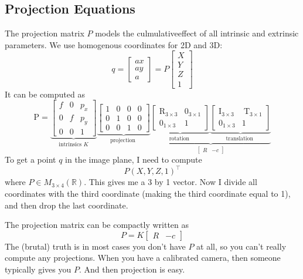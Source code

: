 \documentclass[11pt]{article}
\newcommand{\R}{\mathbb{R}}
\newcommand{\mat}[2]{M_{#1 \times #2}(\R)}
\begin{document}
\subsection{Projection Equations}
The projection matrix $P$ models the culmulativeeffect of all intrinsic and extrinsic parameters. We use homogenous coordinates for 2D and 3D:
\begin{equation}
	q = \begin{bmatrix}
		ax \\ ay \\ a
	\end{bmatrix} = P \begin{bmatrix}
		X \\ Y \\ Z \\ 1
	\end{bmatrix}
\end{equation}
It can be computed as
\begin{equation}
\mathrm{P}=\underbrace{\left[\begin{array}{ccc}
		f & 0 & p_{x} \\
		0 & f & p_{y} \\
		0 & 0 & 1
	\end{array}\right]}_{\text {intrinsics } K} \underbrace{\left[\begin{array}{cccc}
		1 & 0 & 0 & 0 \\
		0 & 1 & 0 & 0 \\
		0 & 0 & 1 & 0
	\end{array}\right]}_{\text {projection }} \underbrace{\underbrace{\left[\begin{array}{cc}
	\mathrm{R}_{3 \times 3} & 0_{3 \times 1} \\
	0_{1 \times 3} & 1
	\end{array}\right]}_{\text {rotation }} \underbrace{\left[\begin{array}{cc}
	\mathrm{I}_{3 \times 3} & \mathrm{~T}_{3 \times 1} \\
		0_{1 \times 3} & 1
	\end{array}\right]}_{\text {translation }}}_{\begin{bmatrix}
		R  &  -c
	\end{bmatrix}}
\end{equation}
To get a point $q$ in the image plane, I need to compute
\begin{equation}
	P(X, Y, Z, 1)^\top
\end{equation}
where $P\in\mat{3}{4}$. This gives me a 3 by 1 vector. Now I divide all coordinates with the third coordinate (making the third coordinate equal to 1), and then drop the last coordinate. 

The projection matrix can be compactly written as 
\begin{equation}
	P = K \begin{bmatrix}
		R & -c
	\end{bmatrix}
\end{equation}
The (brutal) truth is in most cases you don't have $P$ at all, so you can't really compute any projections. When you have a calibrated camera, then someone typically gives you $P$. And then projection is easy. 
\end{document}
